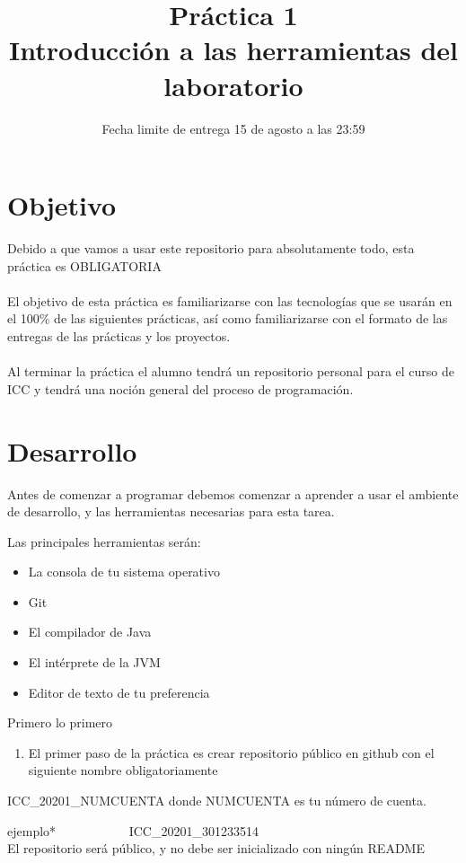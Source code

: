 \documentclass{article}
\title{Práctica 1 \\ Introducción a las herramientas del laboratorio}
\date{Fecha limite de entrega 15 de agosto a las 23:59}
\providecommand{\tightlist}{}
\begin{document}
\maketitle

\section{Objetivo}
{Debido a que vamos a usar este repositorio para absolutamente todo, esta práctica es }{OBLIGATORIA}\\\\

El objetivo de esta práctica es familiarizarse con las tecnologías que se usarán en el 100\% de las siguientes prácticas, así como familiarizarse con el formato de las entregas de las prácticas y los proyectos. \\\\
Al terminar la práctica el alumno tendrá un repositorio personal para el curso de ICC y tendrá una noción general del proceso de programación.

\section{Desarrollo}
Antes de comenzar a programar debemos comenzar a aprender a usar el ambiente de desarrollo, y las herramientas necesarias para esta tarea.

{Las principales herramientas serán:}

\begin{itemize}
\tightlist
\item
  {La consola de tu sistema operativo}
\item
  {Git}
\item
  {El compilador de Java}
\item
  {El intérprete de la JVM}
\item
  {Editor de texto de tu preferencia}
\end{itemize}


{Primero lo primero}

\begin{enumerate}
\tightlist
\item
  {El primer paso de la práctica es crear repositorio público en github con el siguiente nombre }{obligatoriamente}
\end{enumerate}

{ICC\_20201\_NUMCUENTA }{donde NUMCUENTA es tu número de cuenta.}

{ejemplo* ~ ~ ~ ~ ~ ~ ~ICC\_20201\_301233514}
\\
{El repositorio será público, y no debe ser inicializado con ningún README}
\end{document}

